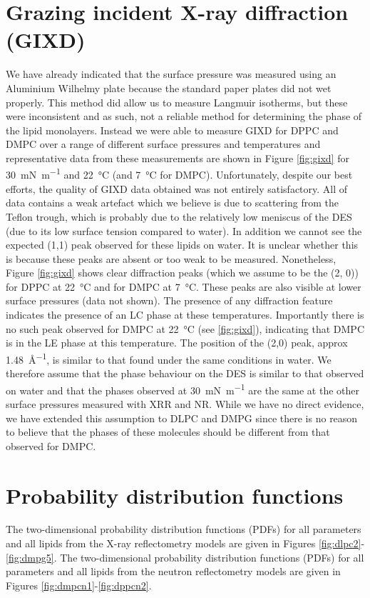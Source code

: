 \documentclass[11pt,a4paper]{paper}
\begin{document}
\section{Grazing incident X-ray diffraction (GIXD)}
\label{sec:gixd}
We have already indicated that the surface pressure was measured using an Aluminium Wilhelmy plate because the standard paper plates did not wet properly. This method did allow us to measure Langmuir isotherms, but these were inconsistent and as such, not a reliable method for determining the phase of the lipid monolayers.
Instead we were able to measure GIXD for DPPC and DMPC over a range of different surface pressures and temperatures and representative data from these measurements are shown in Figure \ref{fig:gixd} for \SI{30}{\milli\newton\per\meter} and \SI{22}{\celsius} (and \SI{7}{\celsius} for DMPC).  Unfortunately, despite our best efforts, the quality of GIXD data obtained was not entirely satisfactory. All of data contains a weak artefact which we believe is due to scattering from the Teflon trough, which is probably due to the relatively low meniscus of the DES (due to its low surface tension compared to water). In addition we cannot see the expected (1,1) peak observed for these lipids on water. It is unclear whether this is because these peaks are absent or too weak to be measured. Nonetheless, Figure \ref{fig:gixd} shows clear diffraction peaks (which we assume to be the (2, 0)) for DPPC at \SI{22}{\celsius} and for DMPC at \SI{7}{\celsius}. These peaks are also visible at lower surface pressures (data not shown). The presence of any diffraction feature indicates the presence of an LC phase at these temperatures. Importantly there is no such peak observed for DMPC at \SI{22}{\celsius} (see \ref{fig:gixd}), indicating that DMPC is in the LE phase at this temperature. The position of the (2,0) peak, approx \SI{1.48}{\AA^{-1}}, is similar to that found under the same conditions in water.\cite{Watkins2009}
We therefore assume that the phase behaviour on the DES is similar to that observed on water and that the phases observed at \SI{30}{\milli\newton\per\meter} are the same at the other surface pressures measured with XRR and NR. While we have no direct evidence, we have extended this assumption to DLPC and DMPG since there is no reason to believe that the phases of these molecules should be different from that observed for DMPC.

\section{Probability distribution functions}
The two-dimensional probability distribution functions (PDFs) for all parameters and all lipids from the X-ray reflectometry models are given in Figures \ref{fig:dlpc2}-\ref{fig:dmpg5}.
The two-dimensional probability distribution functions (PDFs) for all parameters and all lipids from the neutron reflectometry models are given in Figures \ref{fig:dmpcn1}-\ref{fig:dppcn2}.
\end{document}
